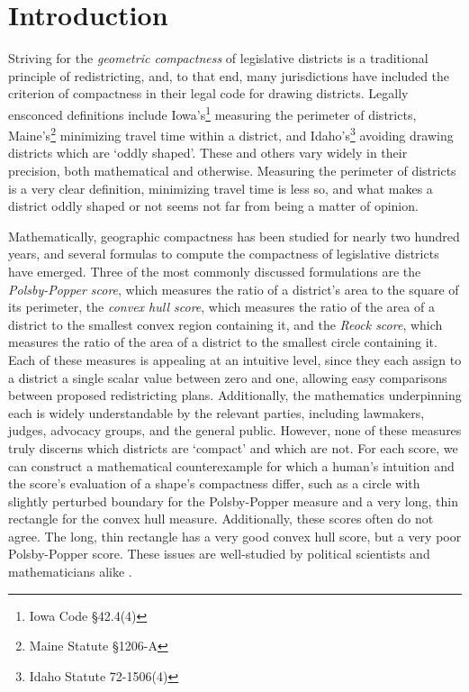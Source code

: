 \section{Introduction}
Striving for the \textit{geometric compactness} of legislative
districts is a traditional principle of redistricting, and, to that
end, many jurisdictions have included the criterion of compactness in
their legal code for drawing districts.  Legally ensconced definitions include Iowa's\footnote{Iowa Code \S42.4(4)} measuring the perimeter of districts, Maine's\footnote{Maine Statute \S1206-A} minimizing travel time within a district, and Idaho's\footnote{Idaho Statute 72-1506(4)} avoiding 
drawing districts which are `oddly shaped'.  These and others vary widely in their 
precision, both mathematical and otherwise.  Measuring the perimeter of districts is a very clear definition, minimizing travel time is less so, and what makes a district oddly shaped or not seems not far from being a matter of opinion. 


Mathematically, geographic compactness has been studied for nearly two hundred years, and several formulas to compute the compactness of legislative districts have emerged.
 Three of the most commonly discussed formulations are the \textit{Polsby-Popper score}, which
measures the ratio of a district's area to the square of its
perimeter, the \textit{convex hull score}, which measures the ratio
of the area of a district to the smallest convex region containing it,
and the \textit{Reock score}, which measures the ratio of the area of
a district to the smallest circle containing it.  Each of these
measures is appealing at an intuitive level, since they each assign to
a district a single scalar value between zero and one, allowing easy
comparisons between proposed redistricting plans. Additionally, the
mathematics underpinning each is widely understandable by the relevant
parties, including lawmakers, judges, advocacy groups, and the general
public.  However, none of these measures truly discerns which districts are `compact' and which are not. 
For each score, we can construct a 
mathematical counterexample for which
a human's intuition and the score's evaluation of a shape's
compactness differ, such as a circle with slightly perturbed boundary
for the Polsby-Popper measure and a very long, thin rectangle for the
convex hull measure. Additionally, these scores often do not agree.
The long, thin rectangle has a very good convex hull score, but a very
poor Polsby-Popper score.  These issues are well-studied by political
scientists and mathematicians alike
\cite{polsby1991third,frolov1975shape,maceachren1985compact}.





